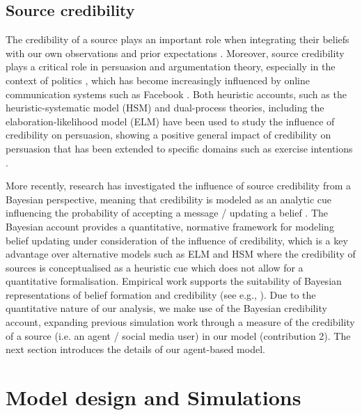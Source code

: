 \documentclass[fleqn,10pt]{wlscirep}
\begin{document}
\subsection*{Source credibility}
The credibility of a source plays an important role when integrating their beliefs with our own observations and prior expectations \cite{cuddy2011dynamics, fiske2007universal}. Moreover, source credibility plays a critical role in persuasion and argumentation theory, especially in the context of politics \cite{housholder2014facebook, robinson1999measures, cialdini1993influence}, which has become increasingly influenced by online communication systems such as Facebook \cite{bail2016combining}. Both heuristic accounts, such as the heuristic-systematic model (HSM) \cite{chaiken1999heuristic} and dual-process theories, including the elaboration-likelihood model (ELM) \cite{petty1986elaboration} have been used to study the influence of credibility on persuasion, showing a positive general impact of credibility on persuasion \cite{chaiken1994heuristic} that has been extended to specific domains such as exercise intentions \cite{jones2003effects}. 

More recently, research has investigated the influence of source credibility from a Bayesian perspective, meaning that credibility is modeled as an analytic cue influencing the probability of accepting a message / updating a belief \cite{bovens2003bayesian, hahn2009argument, harris2009bayesian, oaksford2007bayesian}. The Bayesian account provides a quantitative, normative framework for modeling belief updating under consideration of the influence of credibility, which is a key advantage over alternative models such as ELM and HSM where the credibility of sources is conceptualised as a heuristic cue which does not allow for a quantitative formalisation. Empirical work supports the suitability of Bayesian representations of belief formation and credibility (see e.g., \cite{harris2016appeal}). Due to the quantitative nature of our analysis, we make use of the Bayesian credibility account, expanding previous simulation work \cite{madsen2017growing, madsen2018large} through a measure of the credibility of a source (i.e. an agent / social media user) in our model (contribution 2). The next section introduces the details of our agent-based model.




\section*{Model design and Simulations}
\end{document}
